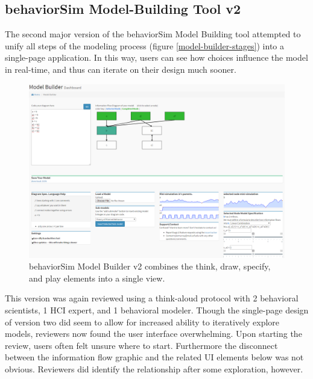 \documentclass[conference]{IEEEtran}
\begin{document}

\subsection{behaviorSim Model-Building Tool v2}
The second major version of the behaviorSim Model Building tool attempted to unify all steps of the modeling process (figure \ref{model-builder-stages}) into a single-page application.
In this way, users can see how choices influence the model in real-time, and thus can iterate on their design much sooner.

\begin{figure}[!t]
  \centering
  \includegraphics[width=0.9\columnwidth]{img/v2}  
  \caption{behaviorSim Model Builder v2 combines the think, draw, specify, and play elements into a single view.}
  \label{model-builder-v2}
\end{figure}

This version was again reviewed using a think-aloud protocol with 2 behavioral scientists, 1 HCI expert, and 1 behavioral modeler.
Though the single-page design of version two did seem to allow for increased ability to iteratively explore models, reviewers now found the user interface overwhelming.
Upon starting the review, users often felt unsure where to start.
Furthermore the disconnect between the information flow graphic and the related UI elements below was not obvious.
Reviewers did identify the relationship after some exploration, however. 

  


  
\end{document}
